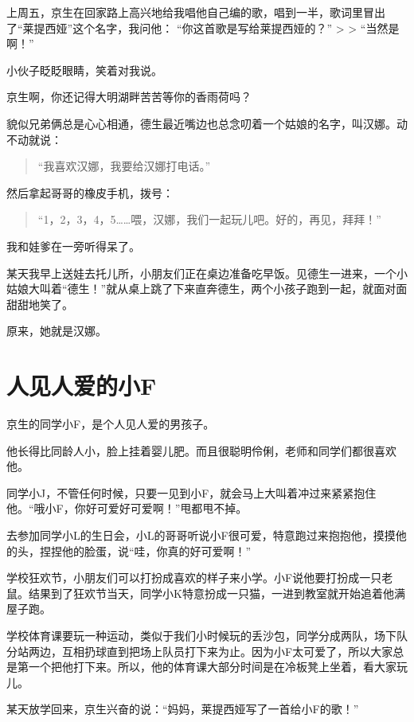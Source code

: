 \documentclass[twoside,openright,headings=optiontohead]{ctexbook} %
\begin{document}
{上周五，京生在回家路上高兴地给我唱他自己编的歌，唱到一半，歌词里冒出了``莱提西娅''这个名字，我问他：
``你这首歌是写给莱提西娅的？'' \textgreater{} \textgreater{}
``当然是啊！''

小伙子眨眨眼睛，笑着对我说。

京生啊，你还记得大明湖畔苦苦等你的香雨荷吗？

貌似兄弟俩总是心心相通，德生最近嘴边也总念叨着一个姑娘的名字，叫汉娜。动不动就说：

\begin{quote}
``我喜欢汉娜，我要给汉娜打电话。''
\end{quote}

然后拿起哥哥的橡皮手机，拨号：

\begin{quote}
``1，2，3，4，5\ldots{}\ldots{}喂，汉娜，我们一起玩儿吧。好的，再见，拜拜！''
\end{quote}

我和娃爹在一旁听得呆了。

某天我早上送娃去托儿所，小朋友们正在桌边准备吃早饭。见德生一进来，一个小姑娘大叫着``德生！''就从桌上跳了下来直奔德生，两个小孩子跑到一起，就面对面甜甜地笑了。

原来，她就是汉娜。

\chapter*{人见人爱的小F}\label{flori}

京生的同学小F，是个人见人爱的男孩子。

他长得比同龄人小，脸上挂着婴儿肥。而且很聪明伶俐，老师和同学们都很喜欢他。

同学小J，不管任何时候，只要一见到小F，就会马上大叫着冲过来紧紧抱住他。``哦小F，你好可爱好可爱啊！''甩都甩不掉。

去参加同学小L的生日会，小L的哥哥听说小F很可爱，特意跑过来抱抱他，摸摸他的头，捏捏他的脸蛋，说``哇，你真的好可爱啊！''

学校狂欢节，小朋友们可以打扮成喜欢的样子来小学。小F说他要打扮成一只老鼠。结果到了狂欢节当天，同学小K特意扮成一只猫，一进到教室就开始追着他满屋子跑。

学校体育课要玩一种运动，类似于我们小时候玩的丢沙包，同学分成两队，场下队分站两边，互相扔球直到把场上队员打下来为止。因为小F太可爱了，所以大家总是第一个把他打下来。所以，他的体育课大部分时间是在冷板凳上坐着，看大家玩儿。

某天放学回来，京生兴奋的说：``妈妈，莱提西娅写了一首给小F的歌！''

}
\end{document}
